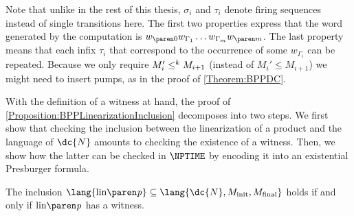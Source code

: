 \documentclass[../../diss.tex]{subfiles}
\begin{document}
Note that unlike in the rest of this thesis, $\sigma_i$ and $\tau_i$ denote firing sequences instead of single transitions here.
The first two properties express that the word generated by the computation is $\dtr{w}{0} w_{\Gamma_1} \ldots w_{\Gamma_m} \dtr{w}{m}$.
The last property means that each infix $\tau_i$ that correspond to the occurrence of some $w_{\Gamma_i}$ can be repeated.
Because we only require $M_i'\leq^k M_{i+1}$ (instead of $M_i'\leq M_{i+1}$) we might need to insert pumps, as in the proof of \cref{Theorem:BPPDC}.

With the definition of a witness at hand, the proof of \cref{Proposition:BPPLinearizationInclusion} decomposes into two steps.
We first show that checking the inclusion between the linearization of a product and the language of $\dc{N}$ amounts to checking the existence of a witness.
Then, we show how the latter can be checked in $\NPTIME$ by encoding it into an existential Presburger formula.

\begin{lemma}%
\label{Lemma:BPPSREDCWitness}%
    The inclusion $\lang{\linof{\product}} \subseteq \lang{\dc{N}, \Minit,\Mfinal}$ holds if and only if $\linof{\product}$ has a witness.
\end{lemma}
\end{document}
